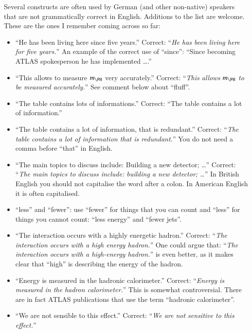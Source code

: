 Several constructs are often used by German (and other non-native) speakers
that are not grammatically correct in English.
Additions to the list are welcome.
These are the ones I remember coming across so far:
\begin{itemize}
\item \enquote{He has been living here since five years.}
  Correct: \enquote{\emph{He has been living here for five years.}}
  An example of the correct use of \enquote{since}:
  \enquote{Since becoming ATLAS spokesperson he has implemented \ldots.}
\item \enquote{This allows to measure \(m_{\PH}\) very accurately.}
  Correct: \enquote{\emph{This allows \(m_{\PH}\) to be measured accurately.}}
  See comment below about \enquote{fluff}.
\item \enquote{The table contains lots of informations.}
  Correct: \enquote{The table contains a lot of information.}
\item \enquote{The table contains a lot of information, that is redundant.}
  Correct: \enquote{\emph{The table contains a lot of information that is redundant.}}
  You do not need a comma before \enquote{that} in English.
\item \enquote{The main topics to discuss include: Building a new detector; \ldots}
  Correct: \enquote{\emph{The main topics to discuss include: building a new detector; \ldots}}
  In British English you should not capitalise the word after a colon.
  In American English it is often capitalised.
\item \enquote{less} and \enquote{fewer}: use \enquote{fewer} for things that you can count and
  \enquote{less} for things you cannot count: \enquote{less energy} and \enquote{fewer jets}.
\item \enquote{The interaction occurs with a highly energetic hadron.}
  Correct: \enquote{\emph{The interaction occurs with a high energy hadron.}}
  One could argue that: \enquote{\emph{The interaction occurs with a high-energy hadron.}}
  is even better, as it makes clear that \enquote{high} is describing the energy of the hadron.
\item \enquote{Energy is measured in the hadronic calorimeter.}
  Correct: \enquote{\emph{Energy is measured in the hadron calorimeter.}}
  This is somewhat controversial.
  There are in fact ATLAS publications that use the term \enquote{hadronic calorimeter}.
\item \enquote{We are not sensible to this effect.}
  Correct: \enquote{\emph{We are not sensitive to this effect.}}

\end{itemize}
